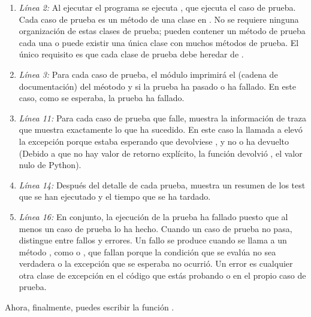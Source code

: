 \begin{enumerate}

\item \emph{Línea 2:} Al ejecutar el programa se ejecuta , que ejecuta el caso de prueba. Cada caso de prueba es un método de una clase en . No se requiere ninguna organización de estas clases de prueba; pueden contener un método de prueba cada una o puede existir una única clase con muchos métodos de prueba. El único requisito es que cada clase de prueba debe heredar de .

\item \emph{Línea 3:} Para cada caso de prueba, el módulo  imprimirá el  (cadena de documentación) del méotodo y si la prueba ha pasado o ha fallado. En este caso, como se esperaba, la prueba ha fallado.

\item \emph{Línea 11:} Para cada caso de prueba que falle,  muestra la información de traza que muestra exactamente lo que ha sucedido. En este caso la llamada a  elevó la excepción  porque estaba esperando que  devolviese , y no o ha devuelto (Debido a que no hay valor de retorno explícito, la función devolvió , el valor nulo de Python).

\item \emph{Línea 14:} Después del detalle de cada prueba,  muestra un resumen de los test que se han ejecutado y el tiempo que se ha tardado.

\item \emph{Línea 16:} En conjunto, la ejecución de la prueba ha fallado puesto que al menos un caso de prueba lo ha hecho. Cuando un caso de prueba no pasa,  distingue entre fallos y errores. Un fallo se produce cuando se llama a un método , como  o , que fallan porque la condición que se evalúa no sea verdadera o la excepción que se esperaba no ocurrió. Un error es cualquier otra clase de excepción en el código que estás probando o en el propio caso de prueba.

\end{enumerate}

Ahora, finalmente, puedes escribir la función .

